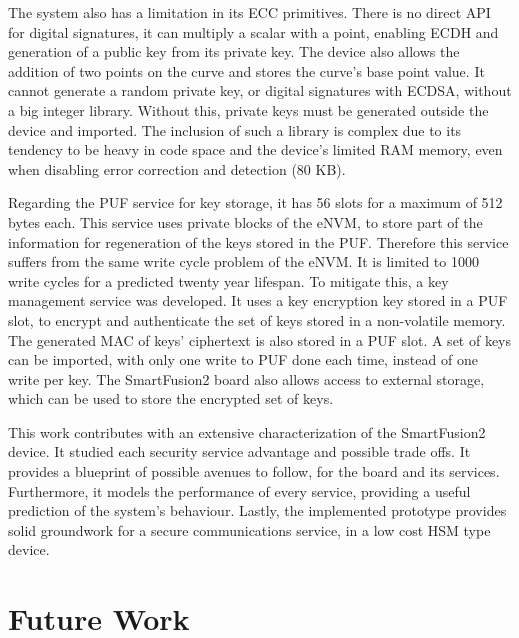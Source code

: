 The system also has a limitation in its ECC primitives. There is no direct API for digital signatures, it can multiply a scalar with a point, enabling ECDH and generation of a public key from its private key. The device also allows the addition of two points on the curve and stores the curve's base point value. It cannot generate a random private key, or digital signatures with ECDSA, without a big integer library. Without this, private keys must be generated outside the device and imported. The inclusion of such a library is complex due to its tendency to be heavy in code space and the device's limited RAM memory, even when disabling error correction and detection (80 KB). 

Regarding the PUF service for key storage, it has 56 slots for a maximum of 512 bytes each. This service uses private blocks of the eNVM, to store part of the information for regeneration of the keys stored in the PUF. Therefore this service suffers from the same write cycle problem of the eNVM. It is limited to 1000 write cycles for a predicted twenty year lifespan. To mitigate this, a key management service was developed. It uses a key encryption key stored in a PUF slot, to encrypt and authenticate the set of keys stored in a non-volatile memory. The generated MAC of keys' ciphertext is also stored in a PUF slot. A set of keys can be imported, with only one write to PUF done each time, instead of one write per key. The SmartFusion2 board also allows access to external storage, which can be used to store the encrypted set of keys.

This work contributes with an extensive characterization of the SmartFusion2 device. It studied each security service advantage and possible trade offs. It provides a blueprint of possible avenues to follow, for the board and its services. Furthermore, it models the performance of every service, providing a useful prediction of the system's behaviour. Lastly, the implemented prototype provides solid groundwork for a secure communications service, in a low cost HSM type device.

\section{Future Work} \label{chap:conclusion:future-work}


